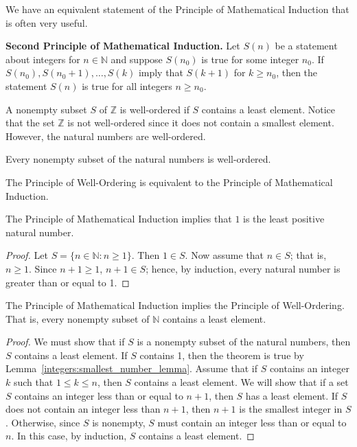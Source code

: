 We have an equivalent statement of the Principle of Mathematical Induction that is often very useful.
 
\medskip

\noindent 
{\bf Second Principle of Mathematical Induction.}  
Let $S(n)$ be a statement about integers for  $n \in {\mathbb N}$ and suppose $S(n_0)$ is true for some integer $n_0$.  If $S(n_0), S(n_0 + 1), \ldots, S(k)$ imply that $S(k + 1)$ for $k \geq n_0$, then the statement $S(n)$ is true for all integers $n \geq n_0$.   

 
\medskip

A  nonempty subset $S$ of ${\mathbb Z}$ is {\bfi well-ordered\/} if $S$ contains a least element.  Notice that the set ${\mathbb Z}$ is not well-ordered since it does not contain a smallest element.  However, the natural numbers are well-ordered. 
 
\medskip
 
Every nonempty subset of the natural numbers is well-ordered. 

\medskip
 
The Principle of Well-Ordering is equivalent to the Principle  of Mathematical Induction. 
 
\begin{lemma}\label{integers:smallest_number_lemma}
The Principle of Mathematical Induction implies that $1$ is the least positive natural number. 
\end{lemma}

\begin{proof}
Let $S = \{ n \in {\mathbb N} : n \geq 1 \}$. Then $1 \in S$.  Now assume that $n \in S$; that is, $n \geq 1$.  Since $n+1 \geq 1$, $n+ 1 \in S$; hence, by induction, every natural number is greater than or equal to 1. 
\end{proof}

\begin{theorem}\label{integers_PMI_implies_PWO}
The Principle of Mathematical Induction implies the Principle of Well-Ordering.  That is, every nonempty subset of $\mathbb N$ contains a least element.
\end{theorem}
 
\begin{proof}
We must show that if $S$ is a nonempty subset of the natural numbers, then $S$ contains a least element.  If $S$ contains 1, then the theorem is true by Lemma~\ref{integers:smallest_number_lemma}.  Assume that if $S$ contains an integer $k$ such that $1 \leq k \leq n$, then $S$ contains a least element.  We will show that if a set $S$ contains an integer less than or equal to $n + 1$, then $S$ has a least element.  If $S$ does not contain an integer less than $n+1$, then $n+1$ is the smallest integer in $S$.  Otherwise, since $S$ is nonempty, $S$ must contain an integer less than or equal to $n$. In this case, by induction, $S$ contains a least element. 
\hspace*{1in} 
\end{proof}

